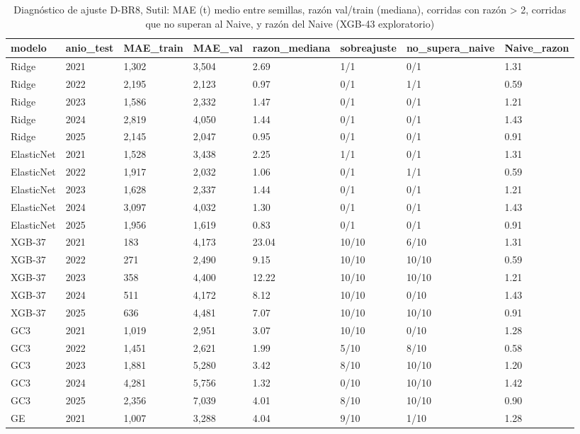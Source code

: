 \begin{table}[H]
\centering
\small
\caption{Diagnóstico de ajuste D-BR8, Sutil: MAE (t) medio entre semillas, razón val/train (mediana), corridas con razón > 2, corridas que no superan al Naive, y razón del Naive (XGB-43 exploratorio)}
\label{tab:T15_diagnostico_sutil}
\begin{tabular}{llllllll}
\toprule
modelo & anio\_test & MAE\_train & MAE\_val & razon\_mediana & sobreajuste & no\_supera\_naive & Naive\_razon \\
\midrule
Ridge & 2021 & 1,302 & 3,504 & 2.69 & 1/1 & 0/1 & 1.31 \\
Ridge & 2022 & 2,195 & 2,123 & 0.97 & 0/1 & 1/1 & 0.59 \\
Ridge & 2023 & 1,586 & 2,332 & 1.47 & 0/1 & 0/1 & 1.21 \\
Ridge & 2024 & 2,819 & 4,050 & 1.44 & 0/1 & 0/1 & 1.43 \\
Ridge & 2025 & 2,145 & 2,047 & 0.95 & 0/1 & 0/1 & 0.91 \\
ElasticNet & 2021 & 1,528 & 3,438 & 2.25 & 1/1 & 0/1 & 1.31 \\
ElasticNet & 2022 & 1,917 & 2,032 & 1.06 & 0/1 & 1/1 & 0.59 \\
ElasticNet & 2023 & 1,628 & 2,337 & 1.44 & 0/1 & 0/1 & 1.21 \\
ElasticNet & 2024 & 3,097 & 4,032 & 1.30 & 0/1 & 0/1 & 1.43 \\
ElasticNet & 2025 & 1,956 & 1,619 & 0.83 & 0/1 & 0/1 & 0.91 \\
XGB-37 & 2021 & 183 & 4,173 & 23.04 & 10/10 & 6/10 & 1.31 \\
XGB-37 & 2022 & 271 & 2,490 & 9.15 & 10/10 & 10/10 & 0.59 \\
XGB-37 & 2023 & 358 & 4,400 & 12.22 & 10/10 & 10/10 & 1.21 \\
XGB-37 & 2024 & 511 & 4,172 & 8.12 & 10/10 & 0/10 & 1.43 \\
XGB-37 & 2025 & 636 & 4,481 & 7.07 & 10/10 & 10/10 & 0.91 \\
GC3 & 2021 & 1,019 & 2,951 & 3.07 & 10/10 & 0/10 & 1.28 \\
GC3 & 2022 & 1,451 & 2,621 & 1.99 & 5/10 & 8/10 & 0.58 \\
GC3 & 2023 & 1,881 & 5,280 & 3.42 & 8/10 & 10/10 & 1.20 \\
GC3 & 2024 & 4,281 & 5,756 & 1.32 & 0/10 & 10/10 & 1.42 \\
GC3 & 2025 & 2,356 & 7,039 & 4.01 & 8/10 & 10/10 & 0.90 \\
GE & 2021 & 1,007 & 3,288 & 4.04 & 9/10 & 1/10 & 1.28 \\

\end{tabular}
\end{table}
